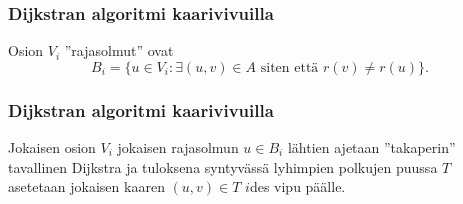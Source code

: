 \documentclass{beamer}
\begin{document}
\begin{frame}
  \frametitle{Dijkstran algoritmi kaarivivuilla}
  Osion $V_i$ ''rajasolmut'' ovat \[
    B_i = \{ u \in V_i \colon \exists (u, v) \in A \text{ siten että } r(v) \neq r(u) \}.
  \]
\end{frame}

\begin{frame}
  \frametitle{Dijkstran algoritmi kaarivivuilla}
  Jokaisen osion $V_i$ jokaisen rajasolmun $u \in B_i$ lähtien ajetaan ''takaperin'' tavallinen Dijkstra ja tuloksena syntyvässä lyhimpien polkujen puussa $T$ asetetaan jokaisen kaaren $(u, v) \in T$ $i$des vipu päälle.
\end{frame}
\end{document}
